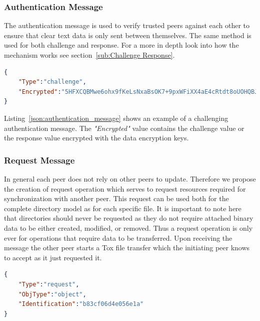 \subsubsection{Authentication Message}
\label{subs:Authentication Message}

The authentication message is used to verify trusted peers against each other to ensure that clear text data is only sent between themselves.
The same method is used for both challenge and response.
For a more in depth look into how the mechanism works see section~\ref{sub:Challenge Response}.

\begin{listing}[htp]
    \begin{lstlisting}[language=json,firstnumber=0]
{
    "Type":"challenge",
    "Encrypted":"5HFXCQBMwe6ohx9fKeLsNxaBsOK7+9pxWFiXX4aE4cRtdt8oUOHQBJ6XrowiwwgLunM="
}
    \end{lstlisting}
\caption[Authentication Message]{An example of a valid authentication message containing a challenge.}
\label{json:authentication_message}
\end{listing}

Listing~\ref{json:authentication_message} shows an example of a challenging authentication message.
The \textit{"Encrypted"} value contains the challenge value or the response value encrypted with the data encryption keys.

\subsubsection{Request Message}
\label{subs:Request Message}

In general each peer does not rely on other peers to update.
Therefore we propose the creation of request operation which serves to request resources required for synchronization with another peer.
This request can be used both for the complete directory model as for each specific file.
It is important to note here that directories should never be requested as they do not require attached binary data to be either created, modified, or removed.
Thus a request operation is only ever for operations that require data to be transferred.
Upon receiving the message the other peer starts a Tox file transfer which the initiating peer knows to accept as it just requested it.

\begin{listing}[htp]
    \begin{lstlisting}[language=json,firstnumber=0]
{
    "Type":"request",
    "ObjType":"object",
    "Identification":"b83cf06d4e056e1a"
}
    \end{lstlisting}
\caption[Request Message]{Example of a JSON request message.}
\label{json:request_message}
\end{listing}

